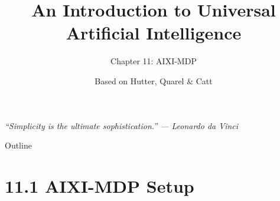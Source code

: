 \documentclass[aspectratio=169,10pt]{beamer}
\title[UAI -- Ch.11 AIXI-MDP]{An Introduction to Universal Artificial Intelligence}
\subtitle{Chapter 11: AIXI-MDP}
\author{Based on Hutter, Quarel \& Catt}
\institute{CRC Press, 2024}
\date{}
\begin{document}

\begin{frame}
  \titlepage
  \begin{center}
  \small\itshape ``Simplicity is the ultimate sophistication.'' --- Leonardo da Vinci
  \end{center}
\end{frame}

\begin{frame}{Outline}
  \tableofcontents
\end{frame}

\section{11.1 AIXI-MDP Setup}
\end{document}
